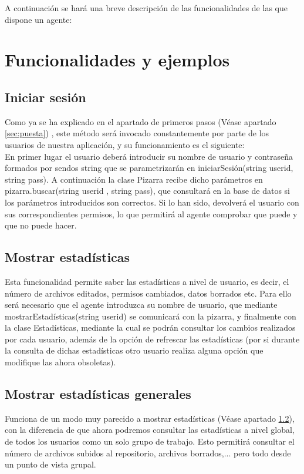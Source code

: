 A continuación se hará una breve descripción de las funcionalidades de las que dispone un agente:
\section{Funcionalidades y ejemplos}
\subsection{Iniciar sesión}
Como ya se ha explicado en el apartado de primeros pasos (Véase apartado \ref{sec:puesta}) , este método será invocado constantemente por parte de los usuarios de nuestra aplicación, y su funcionamiento es el siguiente:\\
En primer lugar el usuario deberá introducir su nombre de usuario y contraseña formados por sendos string que se parametrizarán en iniciarSesión(string userid, string pass). A continuación la clase Pizarra recibe dicho parámetros en pizarra.buscar(string userid , string pass), que consultará en la base de datos si los parámetros introducidos son correctos. Si lo han sido, devolverá el usuario con sus correspondientes permisos, lo que permitirá al agente comprobar que puede y que no puede hacer.

\subsection{Mostrar estadísticas}\label{sec:est}
Esta funcionalidad permite saber las estadísticas a nivel de usuario, es decir, el número de archivos editados, permisos cambiados, datos borrados etc. Para ello será necesario que el agente introduzca su nombre de usuario, que mediante mostrarEstadísticas(string userid) se comunicará con la pizarra, y finalmente con la clase Estadísticas, mediante la cual se podrán consultar los cambios realizados por cada usuario, además de la opción de refrescar las estadísticas (por si durante la consulta de dichas estadísticas otro usuario realiza alguna opción que modifique las ahora obsoletas).
\subsection{Mostrar estadísticas generales}
Funciona de un modo muy parecido a mostrar estadísticas (Véase apartado \ref{sec:est}), con la diferencia de que ahora podremos consultar las estadísticas a nivel global, de todos los usuarios como un solo grupo de trabajo. Esto permitirá consultar el número de archivos subidos al repositorio, archivos borrados,... pero todo desde un punto de vista grupal.
